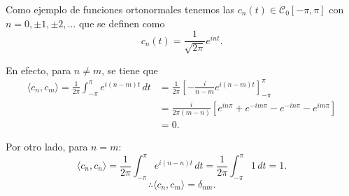 \begin{ejemplo}
Como ejemplo de funciones ortonormales tenemos las $c_n(t) \in \mathscr{C}_0[-\pi,\pi]$ con $n = 0, \pm 1, \pm 2, \dots$ que se definen como
$$c_n(t) = \frac{1}{\sqrt{2\pi}} e^{i nt}.$$

En efecto, para $n \neq m$, se tiene que
\begin{align*}
    \langle c_n , c_m \rangle = \frac{1}{2\pi} \int_{-\pi}^{\pi} e^{i(n-m)t} \,dt &= \frac{1}{2\pi} \left[ -\frac{i}{n-m} e^{i(n-m) t}\right]_{-\pi}^{\pi} \\
    &= \frac{i}{2\pi(m-n)} [e^{i n\pi} + e^{-i m \pi} - e^{-in \pi} - e^{im \pi}] \\
    &= 0.
\end{align*}

Por otro lado, para $n = m$:
\begin{equation*}
  \langle c_n , c_n \rangle =\frac{1}{2\pi} \int_{-\pi}^{\pi} e^{i(n-n)t} \,dt = \frac{1}{2\pi} \int_{-\pi}^{\pi} 1 \,dt = 1.
\end{equation*}
$$\therefore  \langle c_n , c_m \rangle = \delta_{nm}.$$
\end{ejemplo}


